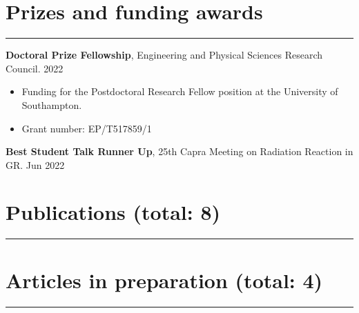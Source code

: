 \documentclass[10.5pt, oneside]{article}   	%
\begin{document}

{\color{Sectioncolour}
\section*{Prizes and funding awards}
\vspace{-3mm}
\noindent\rule{\linewidth}{0.6pt}}

\textbf{Doctoral Prize Fellowship}, Engineering and Physical Sciences Research Council. \hfill 2022 \\
\vspace{-5mm}
\begin{itemize}
\item Funding for the Postdoctoral Research Fellow position at the University of Southampton.
\item Grant number: EP/T517859/1
\end{itemize}
\textbf{Best Student Talk Runner Up}, 25th Capra Meeting on Radiation Reaction in GR. \hfill Jun 2022 \\
 

\newpage

{\color{Sectioncolour}
\section*{Publications {\rm (total: 8)}}
\vspace{-3mm}
\noindent\rule{\linewidth}{0.6pt}}

\nocite{*}

\vspace{-5mm}
\printbibliography[notkeyword={prep},title={~}]

{\color{Sectioncolour} 
\section*{Articles in preparation {\rm (total: 4)}}
\vspace{-3mm}
\noindent\rule{\linewidth}{0.6pt}}

\vspace{-5mm}
\printbibliography[keyword={prep},title={~}]
\end{document}
